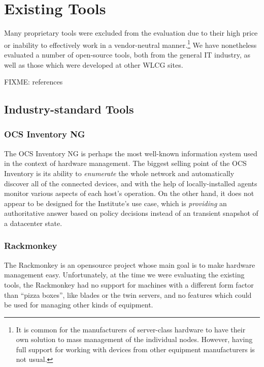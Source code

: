 \documentclass[deska]{subfiles}
\begin{document}
\chapter{Existing Tools}
\label{sec:evaluating-existing-tools}

Many proprietary tools were excluded from the evaluation due to their high price or inability to effectively work in a
vendor-neutral manner.\footnote{It is common for the manufacturers of server-class hardware to have their own solution
to mass management of the individual nodes.  However, having full support for working with devices from other equipment
manufacturers is not usual.}  We have nonetheless evaluated a number of open-source tools, both from the general IT
industry, as well as those which were developed at other WLCG sites.

FIXME: references

\section{Industry-standard Tools}

\subsection{OCS Inventory NG}

The OCS Inventory NG is perhaps the most well-known information system used in the context of hardware management.  The
biggest selling point of the OCS Inventory is its ability to {\em enumerate} the whole network and automatically
discover all of the connected devices, and with the help of locally-installed agents monitor various aspects of each
host's operation.  On the other hand, it does not appear to be designed for the Institute's use case, which is {\em
providing} an authoritative answer based on policy decisions instead of an transient snapshot of a datacenter state.

\subsection{Rackmonkey}

The Rackmonkey is an opensource project whose main goal is to make hardware management easy.  Unfortunately, at the time
we were evaluating the existing tools, the Rackmonkey had no support for machines with a different form factor than
``pizza boxes'', like blades or the twin servers, and no features which could be used for managing other kinds of
equipment.
\end{document}
